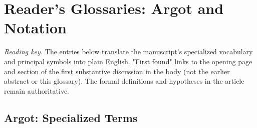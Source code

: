 \documentclass[11pt,letterpaper]{article}
\theoremstyle{definition}
\theoremstyle{plain}
\theoremstyle{definition}
\begin{document}
\section*{Reader's Glossaries: Argot and Notation}
\noindent\emph{Reading key.} The entries below translate the manuscript's specialized vocabulary and principal symbols into plain English. "First found" links to the opening page and section of the first substantive discussion in the body (not the earlier abstract or this glossary). The formal definitions and hypotheses in the article remain authoritative.
\subsection*{Argot: Specialized Terms}
\begingroup\small\setlength{\tabcolsep}{4pt}\renewcommand{\arraystretch}{1.16}
\end{document}
